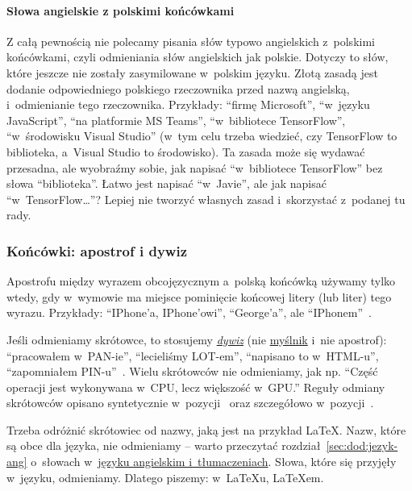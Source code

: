 \paragraph{Słowa angielskie z polskimi końcówkami}
\label{sec:dod:jezyk-ang-polskie-koncowki}
Z całą pewnością nie polecamy pisania słów typowo angielskich z~polskimi końcówkami, czyli odmieniania słów angielskich jak polskie. Dotyczy to słów, które jeszcze nie zostały zasymilowane w~polskim języku. Złotą zasadą jest dodanie odpowiedniego polskiego rzeczownika przed nazwą angielską, i~odmienianie tego rzeczownika. Przykłady: ``firmę Microsoft'', ``w~języku JavaScript'', ``na platformie MS Teams'', ``w~bibliotece TensorFlow'', ``w~środowisku Visual Studio'' (w~tym celu trzeba wiedzieć, czy TensorFlow to biblioteka, a~Visual Studio to środowisko). Ta zasada może się wydawać przesadna, ale wyobraźmy sobie, jak napisać ``w~bibliotece TensorFlow'' bez słowa ``biblioteka''. Łatwo jest napisać ``w~Javie'', ale jak napisać ``w~TensorFlow\dots''? Lepiej nie tworzyć własnych zasad i~skorzystać z~podanej tu rady.


\subsubsection{Końcówki: apostrof i dywiz}
\label{sec:dod:apostrof-dywiz}

Apostrofu między wyrazem obcojęzycznym a~polską końcówką używamy tylko wtedy, gdy w~wymowie ma miejsce pominięcie końcowej litery (lub liter) tego wyrazu. Przykłady: ``IPhone'a, IPhone'owi'', ``George'a'', ale ``IPhonem''~.

Jeśli odmieniamy skrótowce, to stosujemy {\em \hyperref[sec:dod:myslnik-minus-dywiz]{dywiz}} (nie \hyperref[sec:dod:myslnik-minus-dywiz]{myślnik} i~nie apostrof): ``pracowałem w~PAN-ie'', ``lecieliśmy LOT-em'', ``napisano to w~HTML-u'', ``zapomniałem PIN-u''~. Wielu skrótowców nie odmieniamy, jak np. ``Część operacji jest wykonywana w~CPU, lecz większość w~GPU.'' Reguły odmiany skrótowców opisano syntetycznie w~pozycji~ oraz szczegółowo w~pozycji~.

Trzeba odróżnić skrótowiec od nazwy, jaką jest na przykład \LaTeX{}. Nazw, które są obce dla języka, nie odmieniamy -- warto przeczytać rozdział~\ref{sec:dod:jezyk-ang} o~słowach w~\hyperref[sec:dod:jezyk-ang]{języku angielskim i~tłumaczeniach}. Słowa, które się przyjęły w~języku, odmieniamy. Dlatego piszemy: w~\LaTeX{}u, \LaTeX{}em.  


